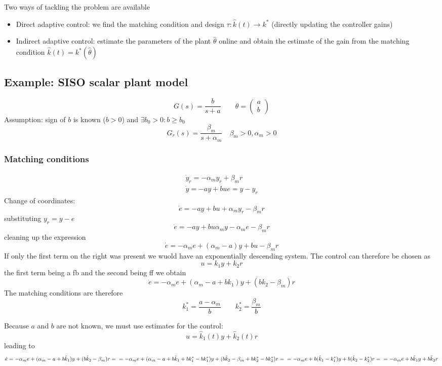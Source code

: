 \documentclass{book}
\begin{document}
Two ways of tackling the problem are available 
\begin{itemize}
    \item Direct adaptive control: we find the matching condition and design $\tau: \hat{k}(t)\to k^*$ (directly updating the controller gains)
    \item Indirect adaptive control: estimate the parameters of the plant $\hat{\theta}$ online and obtain the estimate of the gain from the matching condition $\hat{k}(t)=k^*(\hat{\theta})$
\end{itemize}

\subsection{Example: SISO scalar plant model}
\[
    G(s)=\displaystyle\frac{b}{s+a} \qquad \theta=\begin{pmatrix}
        a \\ b
    \end{pmatrix}
\]
Assumption: sign of $b$ is known ($b>0$) and $\exists b_0>0:b\geq b_0$
\[
    G_r(s)=\displaystyle\frac{\beta_m}{s+\alpha_m}\quad \beta_m>0,\alpha_m>0
\]
\subsubsection{Matching conditions }
\begin{gather*}
    \dot{y}_r=-\alpha_my_r+\beta_mr\\
    \dot{y}=-ay+bu
    e=y-y_r
\end{gather*}
Change of coordinates: 
\[
    \dot{e}=-ay+bu+\alpha_m y_r- \beta_mr
\]
substituting $y_r=y-e$ 
\[
    \dot{e}=-ay+bu\alpha_my-\alpha_me-\beta_mr
\]
cleaning up the expression 
\[
    \dot{e}=-\alpha_me+(\alpha_m-a)y+bu-\beta_mr
\]
If only the first term on the right was present we wuold have an exponentially descending system. The control can therefore be chosen as 
\[
    u=k_1y+k_2r
\]
the first term being a fb and the second being ff we obtain 
\[
    \dot{e}=-\alpha_me+(\alpha_m-a+bk_1)y+(bk_2-\beta_m)r
\]
The matching conditions are therefore 
\[
    k_1^* = \displaystyle\frac{a-\alpha_m}{b} \qquad k_2^* = \displaystyle\frac{\beta_m}{b}
\]

Because $a$ and $b$ are not known, we must use estimates for the control:
\[
u=\hat{k}_1(t)y + \hat{k}_2(t)r 
\]
leading to
\[
    \dot{e}=-\alpha_me+(\alpha_m-a+b\hat{k}_1)y+(b\hat{k}_2-\beta_m)r=\\
    =-\alpha_me+(\alpha_m-a+b\hat{k}_1+bk_1^*-bk_1^*)y+(b\hat{k}_2-\beta_m+bk_2^*-bk_2^*)r=\\
    =-\alpha_me+b(\hat{k}_1-k_1^*)y+b(\hat{k}_2-k_2^*)r = \\
    =-\alpha_me+b\tilde{k}_1y + b\tilde{k}_2r
\]
\end{document}
